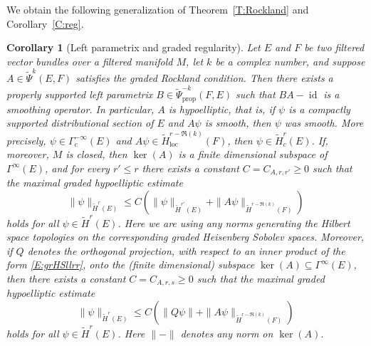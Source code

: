 \documentclass[reqno,12pt]{amsart}
\DeclareMathOperator{\id}{id}
\newcommand\prop{\textrm{prop}}
\newcommand\loc{\textrm{loc}}
\theoremstyle{plain}
\newtheorem{corollary}[theorem]{Corollary}
\theoremstyle{definition}
\begin{document}
We obtain the following generalization of Theorem~\ref{T:Rockland} and Corollary~\ref{C:reg}.


\begin{corollary}[Left parametrix and graded regularity]\label{C:graded-regularity}
Let $E$ and $F$ be two filtered vector bundles over a filtered manifold $M$, let $k$ be a complex number, and suppose $A\in\tilde\Psi^k(E,F)$ satisfies the graded Rockland condition.
Then there exists a properly supported left parametrix $B\in\tilde\Psi^{-k}_\prop(F,E)$ such that $BA-\id$ is a smoothing operator.
In particular, $A$ is hypoelliptic, that is, if $\psi$ is a compactly supported distributional section of $E$ and $A\psi$ is smooth, then $\psi$ was smooth.
More precisely, $\psi\in\Gamma^{-\infty}_c(E)$ and $A\psi\in\tilde H^{r-\Re(k)}_\loc(F)$, then $\psi\in\tilde H^r_c(E)$.
If, moreover, $M$ is closed, then $\ker(A)$ is a finite dimensional subspace of\/ $\Gamma^\infty(E)$, and for every $r'\leq r$ there exists a constant $C=C_{A,r,r'}\geq0$ such that the maximal graded hypoelliptic estimate
\begin{equation}\label{E:grmhesti}
\|\psi\|_{\tilde H^r(E)}\leq C\left(\|\psi\|_{\tilde H^{r'}(E)}+\|A\psi\|_{\tilde H^{r-\Re(k)}(F)}\right)
\end{equation}
holds for all $\psi\in\tilde H^r(E)$.
Here we are using any norms generating the Hilbert space topologies on the corresponding graded Heisenberg Sobolev spaces.
Moreover, if $Q$ denotes the orthogonal projection, with respect to an inner product of the form \eqref{E:grHSllrr}, onto the (finite dimensional) subspace $\ker(A)\subseteq\Gamma^\infty(E)$, then there exists a constant $C=C_{A,r,s}\geq0$ such that the maximal graded hypoelliptic estimate
\begin{equation}\label{E:grmheestiQ}
\|\psi\|_{\tilde H^r(E)}\leq C\left(\|Q\psi\|+\|A\psi\|_{\tilde H^{r-\Re(k)}(F)}\right)
\end{equation}
holds for all $\psi\in\tilde H^r(E)$. Here $\|-\|$ denotes any norm on $\ker(A)$.
\end{corollary}
\end{document}
